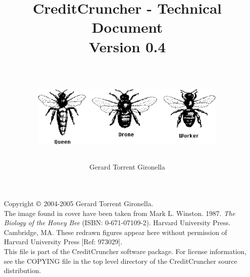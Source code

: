 
%
%
%
%
%
%
%
%

\title{CreditCruncher - Technical Document \\
Version 0.4 \\
\ \\
\centerline{\includegraphics[height=3cm, angle=0]{./images/threebees.eps}}
}

\author{Gerard Torrent Gironella}

\maketitle

\thispagestyle{empty}

\newpage

\vspace*{6in}

\noindent Copyright $\copyright$ 2004-2005 Gerard Torrent Gironella.\\

\noindent The image found in cover have been taken from Mark L. Winston. 1987. 
\emph{The Biology of the Honey Bee} (ISBN: 0-671-07109-2). Harvard University 
Press. Cambridge, MA. These redrawn figures appear here without permission of 
Harvard University Press [Ref: 973029].\\

\noindent This file is part of the CreditCruncher software package.  For
license information, see the COPYING file in the top level directory
of the CreditCruncher source distribution.
